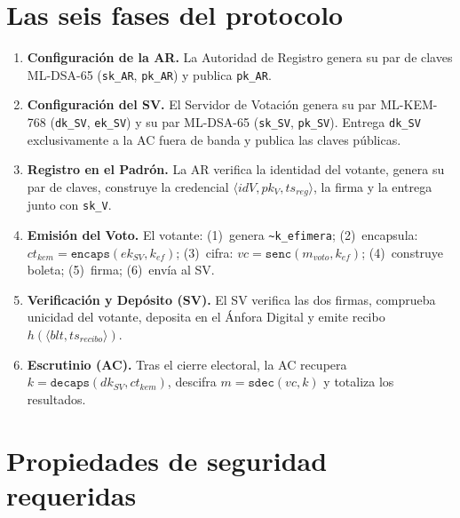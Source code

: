 \documentclass[12pt, a4paper, twoside, openright]{book}
\begin{document}
\section{Las seis fases del protocolo}

\begin{enumerate}[label=\textbf{Fase \Alph*:}, leftmargin=*, itemsep=8pt]

  \item \textbf{Configuraci\'on de la AR.} La Autoridad de Registro
    genera su par de claves ML-DSA-65 (\texttt{sk\_AR}, \texttt{pk\_AR})
    y publica \texttt{pk\_AR}.

  \item \textbf{Configuraci\'on del SV.} El Servidor de Votaci\'on genera
    su par ML-KEM-768 (\texttt{dk\_SV}, \texttt{ek\_SV}) y su par
    ML-DSA-65 (\texttt{sk\_SV}, \texttt{pk\_SV}). Entrega
    \texttt{dk\_SV} exclusivamente a la AC fuera de banda y publica
    las claves p\'ublicas.

  \item \textbf{Registro en el Padr\'on.} La AR verifica la identidad
    del votante, genera su par de claves, construye la credencial
    $\langle idV, pk_V, ts_{reg} \rangle$, la firma y la entrega
    junto con \texttt{sk\_V}.

  \item \textbf{Emisi\'on del Voto.} El votante: (1)~genera
    \texttt{\textasciitilde k\_efimera}; (2)~encapsula:
    $ct_{kem} = \texttt{encaps}(ek_{SV}, k_{ef})$; (3)~cifra:
    $vc = \texttt{senc}(m_{voto}, k_{ef})$; (4)~construye boleta;
    (5)~firma; (6)~env\'ia al SV.

  \item \textbf{Verificaci\'on y Dep\'osito (SV).} El SV verifica las
    dos firmas, comprueba unicidad del votante, deposita en el \'Anfora
    Digital y emite recibo $h(\langle blt, ts_{recibo}\rangle)$.

  \item \textbf{Escrutinio (AC).} Tras el cierre electoral, la AC
    recupera $k = \texttt{decaps}(dk_{SV}, ct_{kem})$, descifra
    $m = \texttt{sdec}(vc, k)$ y totaliza los resultados.

\end{enumerate}

\section{Propiedades de seguridad requeridas}
\end{document}
